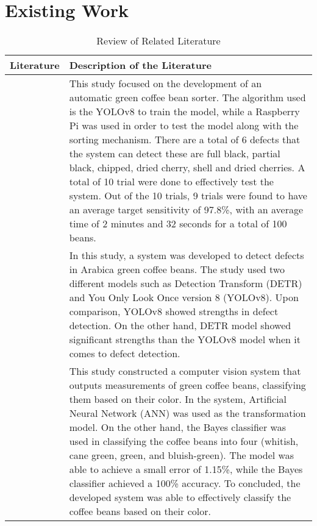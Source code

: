 \section{Existing Work}

\begin{center}
	\begin{longtable}{| p{4cm} | p{10cm} |}
		\caption{Review of Related Literature} 
		\label{tab:related_lit}
		\endfirsthead
		\endhead
		\hline
		
		\textbf{Literature} & \textbf{Description of the Literature} \\ 
		\hline

		\cite{Balay_Cabrera_Jensen_Mayuga_2024}
		&
		This study focused on the development of an automatic green coffee bean sorter. The algorithm used is the YOLOv8 to train the model, while a Raspberry Pi was used in order to test the model along with the sorting mechanism. There are a total of 6 defects that the system can detect these are full black, partial black, chipped, dried cherry, shell and dried cherries. A total of 10 trial were done to effectively test the system.  Out of the 10 trials, 9 trials were found to have an average target sensitivity of 97.8\%, with an average time of 2 minutes and 32 seconds for a total of 100 beans. \\
		\hline

		\cite{Amadea_Rachmawati_Ferdian_Akbar_2024}
		&
		In this study, a system was developed to detect defects in Arabica green coffee beans. The study used two different models such as Detection Transform (DETR) and You Only Look Once version 8 (YOLOv8). Upon comparison, YOLOv8 showed strengths in defect detection. On the other hand, DETR model showed significant strengths than the YOLOv8 model when it comes to defect detection. \\ 
		\hline

		\cite{de_Oliveira_Leme_Barbosa_Rodarte_Pereira_2016}
		&
		This study constructed a computer vision system that outputs measurements of green coffee beans, classifying them based on their color. In the system, Artificial Neural Network (ANN) was used as the transformation model. On the other hand, the Bayes classifier was used in classifying the coffee beans into four (whitish, cane green, green, and bluish-green). The model was able to achieve a small error of 1.15\%, while the Bayes classifier achieved a 100\% accuracy. To concluded, the developed system was able to effectively classify the coffee beans based on their color. \\
		\hline


\end{longtable}
\end{center}
